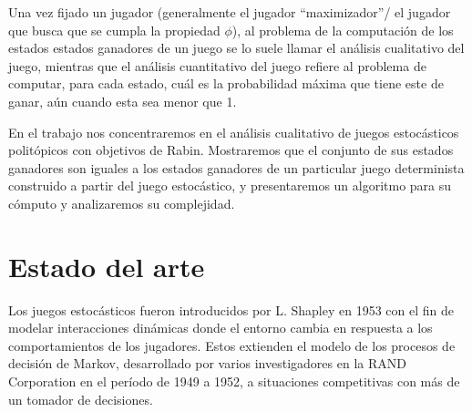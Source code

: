 Una vez fijado un jugador (generalmente el jugador ``maximizador''/ el jugador
que busca que se cumpla la propiedad $\phi$), al problema de la computación de
los estados estados ganadores de un juego se lo suele llamar el análisis
cualitativo del juego, mientras que el análisis cuantitativo del juego refiere
al problema de computar, para cada estado, cuál es la probabilidad máxima que
tiene este de ganar, aún cuando esta sea menor que 1.

En el trabajo nos concentraremos en el análisis cualitativo de juegos
estocásticos politópicos con objetivos de Rabin. Mostraremos que el conjunto de
sus estados ganadores son iguales a los estados ganadores de un particular
juego determinista construido a partir del juego estocástico, y presentaremos
un algoritmo para su cómputo y analizaremos su complejidad.


\section{Estado del arte}

Los juegos estocásticos fueron introducidos por L. Shapley en 1953
\cite{Shapley1953} con el fin de modelar interacciones dinámicas donde el
entorno cambia en respuesta a los comportamientos de los jugadores. Estos
extienden el modelo de los procesos de decisión de Markov, desarrollado por
varios investigadores en la RAND Corporation en el período de 1949 a 1952, a
situaciones competitivas con más de un tomador de decisiones.


